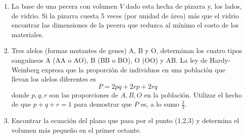 \documentclass[fleqn, 12pt]{article}
\begin{document}
\begin{enumerate}
        \item La base de una pecera con volumen $ V $ dado esta hecha de pizarra y, los lados, de vidrio. Si la pizarra cuesta 5 veces (por unidad de área) más que el vidrio encontrar las dimensiones de la pecera que reduzca al mínimo el costo de los materiales.
        

        \item Tres alelos (formas mutantes de genes) A, B y O, determinan los cuatro tipos sanguíneos A (AA o AO), B (BB o BO), O (OO) y AB. La ley de Hardy-Weinberg expresa que la proporción de individuos en una población que llevan los alelos diferentes es
        $$ P = 2pq + 2rp + 2rq $$
        donde $ p, q, r $ son las proporciones de $ A, B, O $ en la población. Utilizar el hecho de que $ p + q + r = 1 $ para demostrar que $ P $ es, a lo sumo $ \frac{2}{3} $.


        \item Encontrar la ecuación del plano que pasa por el punto (1,2,3) y determina el volumen más pequeño en el primer octante.
        
    \end{enumerate}
\end{document}
